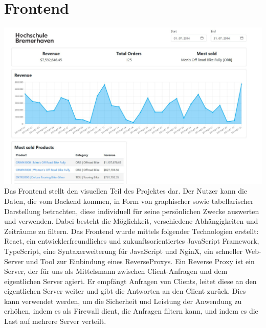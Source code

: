 \section*{Frontend}
\newline
\includegraphics[width=\linewidth]{src/abbildungen/Frontend.png}
\newline
\newline
\newline
Das Frontend stellt den visuellen Teil des Projektes dar. Der Nutzer kann die Daten, die vom Backend kommen, in Form von graphischer sowie tabellarischer Darstellung betrachten, diese individuell für seine persönlichen Zwecke auswerten und verwenden. Dabei besteht die Möglichkeit, verschiedene Abhängigkeiten und Zeiträume zu filtern.
\newline
\newline
Das Frontend wurde mittels folgender Technologien erstellt: React, ein entwicklerfreundliches und zukunftsorientiertes JavaScript Framework, TypeScript, eine Syntaxerweiterung für JavaScript und NginX, ein schneller Web-Server und Tool zur Einbindung eines ReverseProxys.
\newline
\newline
Ein Reverse Proxy ist ein Server, der für uns als Mittelsmann zwischen Client-Anfragen und dem eigentlichen Server agiert. Er empfängt Anfragen von Clients, leitet diese an den eigentlichen Server weiter und gibt die Antworten an den Client zurück. Dies kann verwendet werden, um die Sicherheit und Leistung der Anwendung zu erhöhen, indem es als Firewall dient, die Anfragen filtern kann, und indem es die Last auf mehrere Server verteilt.

